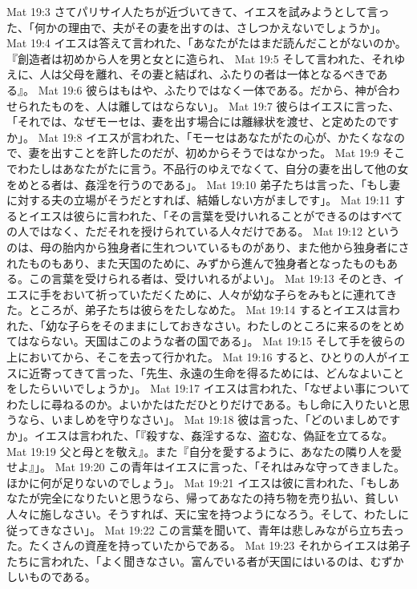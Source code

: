 Mat 19:3  さてパリサイ人たちが近づいてきて、イエスを試みようとして言った、「何かの理由で、夫がその妻を出すのは、さしつかえないでしょうか」。
Mat 19:4  イエスは答えて言われた、「あなたがたはまだ読んだことがないのか。『創造者は初めから人を男と女とに造られ、
Mat 19:5  そして言われた、それゆえに、人は父母を離れ、その妻と結ばれ、ふたりの者は一体となるべきである』。
Mat 19:6  彼らはもはや、ふたりではなく一体である。だから、神が合わせられたものを、人は離してはならない」。
Mat 19:7  彼らはイエスに言った、「それでは、なぜモーセは、妻を出す場合には離縁状を渡せ、と定めたのですか」。
Mat 19:8  イエスが言われた、「モーセはあなたがたの心が、かたくななので、妻を出すことを許したのだが、初めからそうではなかった。
Mat 19:9  そこでわたしはあなたがたに言う。不品行のゆえでなくて、自分の妻を出して他の女をめとる者は、姦淫を行うのである」。
Mat 19:10  弟子たちは言った、「もし妻に対する夫の立場がそうだとすれば、結婚しない方がましです」。
Mat 19:11  するとイエスは彼らに言われた、「その言葉を受けいれることができるのはすべての人ではなく、ただそれを授けられている人々だけである。
Mat 19:12  というのは、母の胎内から独身者に生れついているものがあり、また他から独身者にされたものもあり、また天国のために、みずから進んで独身者となったものもある。この言葉を受けられる者は、受けいれるがよい」。
Mat 19:13  そのとき、イエスに手をおいて祈っていただくために、人々が幼な子らをみもとに連れてきた。ところが、弟子たちは彼らをたしなめた。
Mat 19:14  するとイエスは言われた、「幼な子らをそのままにしておきなさい。わたしのところに来るのをとめてはならない。天国はこのような者の国である」。
Mat 19:15  そして手を彼らの上においてから、そこを去って行かれた。
Mat 19:16  すると、ひとりの人がイエスに近寄ってきて言った、「先生、永遠の生命を得るためには、どんなよいことをしたらいいでしょうか」。
Mat 19:17  イエスは言われた、「なぜよい事についてわたしに尋ねるのか。よいかたはただひとりだけである。もし命に入りたいと思うなら、いましめを守りなさい」。
Mat 19:18  彼は言った、「どのいましめですか」。イエスは言われた、「『殺すな、姦淫するな、盗むな、偽証を立てるな。
Mat 19:19  父と母とを敬え』。また『自分を愛するように、あなたの隣り人を愛せよ』」。
Mat 19:20  この青年はイエスに言った、「それはみな守ってきました。ほかに何が足りないのでしょう」。
Mat 19:21  イエスは彼に言われた、「もしあなたが完全になりたいと思うなら、帰ってあなたの持ち物を売り払い、貧しい人々に施しなさい。そうすれば、天に宝を持つようになろう。そして、わたしに従ってきなさい」。
Mat 19:22  この言葉を聞いて、青年は悲しみながら立ち去った。たくさんの資産を持っていたからである。
Mat 19:23  それからイエスは弟子たちに言われた、「よく聞きなさい。富んでいる者が天国にはいるのは、むずかしいものである。
